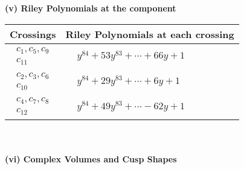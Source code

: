 \documentclass[1p]{elsarticle_modified}
\theoremstyle{definition}
\begin{document}
\newpage\renewcommand{\arraystretch}{1}
\flushleft \textbf{(v) Riley Polynomials at the component}\newline \\
\begin{tabular}{m{50pt}|m{274pt}}
Crossings & \hspace{64pt}Riley Polynomials at each crossing \\
\hline $$\begin{aligned}c_{1},c_{5},c_{9}\\c_{11}\end{aligned}$$&$\begin{aligned}
&y^{84}+53 y^{83}+\cdots+66 y+1
\end{aligned}$\\
\hline $$\begin{aligned}c_{2},c_{3},c_{6}\\c_{10}\end{aligned}$$&$\begin{aligned}
&y^{84}+29 y^{83}+\cdots+6 y+1
\end{aligned}$\\
\hline $$\begin{aligned}c_{4},c_{7},c_{8}\\c_{12}\end{aligned}$$&$\begin{aligned}
&y^{84}+49 y^{83}+\cdots-62 y+1
\end{aligned}$\\
\hline
\end{tabular}\\~\\
\newpage\flushleft \textbf{(vi) Complex Volumes and Cusp Shapes}
\end{document}
